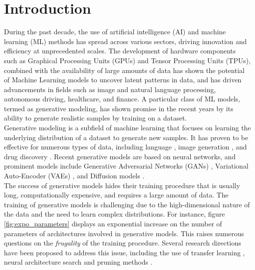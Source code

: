 %
\chapter{Introduction}\label{sec:intro}
During the past decade, the use of artificial intelligence (AI) and machine learning (ML) methods has spread across various sectors, driving innovation and efficiency at unprecedented scales.
The development of hardware components such as Graphical Processing Units (GPUs) and Tensor Processing Units (TPUs), combined with the availability of large amounts of data has shown the potential of Machine Learning models to uncover latent patterns in data, and has 
driven advancements in fields such as image and natural language processing, autonomous driving, healthcare, and finance. A particular class of ML models, termed as generative modeling, has shown promise in the recent years by its ability to generate realistic samples by training on a dataset.
\\
Generative modeling is a subfield of machine learning that focuses on learning the underlying distribution of a dataset to generate new samples. It has proven to be effective for numerous types of data, including language \citep{openai2024gpt4technicalreport}, image generation \citep{rombach2022highresolutionimagesynthesislatent}, and drug discovery \citep{jumper2021highly}.
Recent generative models are based on neural networks, and prominent models include Generative Adversarial Networks (GANs) \citep{goodfellow2014generativeadversarialnetworks}, Variational Auto-Encoder (VAEs) \citep{Kingma_2019}, and Diffusion models \citep{song2021scorebasedgenerativemodelingstochastic}.
\\
The success of generative models hides their training procedure that is usually long, computationally expensive, and requires a large amount of data. The training of generative models is challenging due to the high-dimensional nature of the data and the need to learn complex distributions. For instance, figure \ref{fig:expo_parameters} displays an exponential increase on the number of parameters of architectures involved in generative models.
This raises numerous questions on the \textit{frugality} of the training procedure. Several research directions have been proposed to address this issue, including the use of transfer learning \citep{zhuang2020comprehensivesurveytransferlearning}, neural architecture search \citep{verbockhaven2024growingtinynetworksspotting} and pruning methods \citep{sun2024simpleeffectivepruningapproach}.
